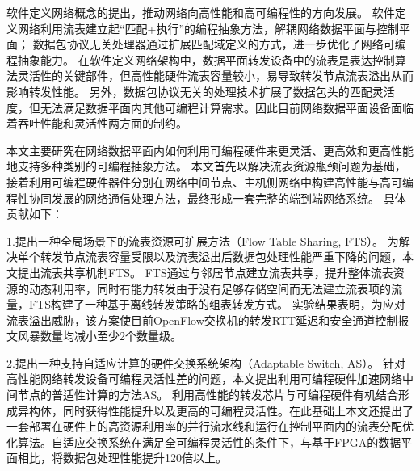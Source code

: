 
\setcounter{page}{1}

%
%
%

软件定义网络概念的提出，推动网络向高性能和高可编程性的方向发展。
软件定义网络利用流表建立起“匹配+执行”的编程抽象方法，解耦网络数据平面与控制平面；
数据包协议无关处理器通过扩展匹配域定义的方式，进一步优化了网络可编程抽象能力。
在软件定义网络架构中，数据平面转发设备中的流表是表达控制算法灵活性的关键部件，但高性能硬件流表容量较小，易导致转发节点流表溢出从而影响转发性能。
另外，数据包协议无关的处理技术扩展了数据包头的匹配灵活度，但无法满足数据平面内其他可编程计算需求。因此目前网络数据平面设备面临着吞吐性能和灵活性两方面的制约。

本文主要研究在网络数据平面内如何利用可编程硬件来更灵活、更高效和更高性能地支持多种类别的可编程抽象方法。
本文首先以解决流表资源瓶颈问题为基础，接着利用可编程硬件器件分别在网络中间节点、主机侧网络中构建高性能与高可编程性协同发展的网络通信处理方法，最终形成一套完整的端到端网络系统。
具体贡献如下：

1.提出一种全局场景下的流表资源可扩展方法（Flow Table Sharing, FTS）。
为解决单个转发节点流表容量受限以及流表溢出后数据包处理性能严重下降的问题，本文提出流表共享机制FTS。
FTS通过与邻居节点建立流表共享，提升整体流表资源的动态利用率，同时有能力转发由于没有足够存储空间而无法建立流表项的流量，FTS构建了一种基于离线转发策略的组表转发方式。
实验结果表明，为应对流表溢出威胁，该方案使目前OpenFlow交换机的转发RTT延迟和安全通道控制报文风暴数量均减小至少2个数量级。

2.提出一种支持自适应计算的硬件交换系统架构（Adaptable Switch, AS）。
针对高性能网络转发设备可编程灵活性差的问题，本文提出利用可编程硬件加速网络中间节点的普适性计算的方法AS。
利用高性能的转发芯片与可编程硬件有机结合形成异构体，同时获得性能提升以及更高的可编程灵活性。在此基础上本文还提出了一套部署在硬件上的高资源利用率的并行流水线和运行在控制平面内的流表分配优化算法。自适应交换系统在满足全可编程灵活性的条件下，与基于FPGA的数据平面相比，将数据包处理性能提升120倍以上。

